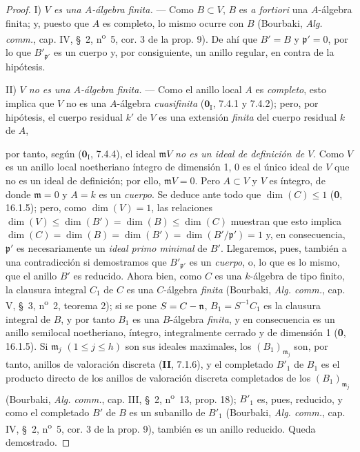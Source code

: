 \begin{proof}
I) \emph{$V$ es una $A$-álgebra finita.} --- Como $B\subset V$, $B$ es
\emph{a fortiori} una $A$-álgebra finita; y, puesto que $A$ es completo,
lo mismo ocurre con $B$ (Bourbaki, \emph{Alg. comm.}, cap. IV, \S~2,
n\textsuperscript{o}~5, cor. 3 de la prop. 9). De ahí que $B'=B$ y
$\mathfrak p'=0$, por lo que $B'_{\mathfrak p'}$ es un cuerpo y, por
consiguiente, un anillo regular, en contra de la hipótesis.

II) \emph{$V$ no es una $A$-álgebra finita.} --- Como el anillo local
$A$ es \emph{completo}, esto implica que $V$ no es una $A$-álgebra
\emph{cuasifinita} ($\mathbf{0}_{\mathrm I}$, 7.4.1 y 7.4.2); pero, por hipótesis, el
cuerpo residual $k'$ de $V$ es una extensión \emph{finita} del cuerpo residual
$k$ de $A$,


por tanto, según ($\mathbf{0}_{\mathrm I}$, 7.4.4), el ideal $\mathfrak mV$
\emph{no es un ideal de definición de} $V$. Como $V$ es un anillo local noetheriano
íntegro de dimensión 1, 0 es el único ideal de $V$ que no es un ideal
de definición; por ello, $\mathfrak mV=0$. Pero $A\subset V$ y $V$ es
íntegro, de donde $\mathfrak m=0$ y $A=k$ es un \emph{cuerpo}. Se deduce ante
todo que $\dim(C)\leqslant1$ (\textbf 0, 16.1.5); pero, como $\dim(V)=1$, las
relaciones
$\dim(V)\leqslant\dim(B')=\dim(B)\leqslant\dim(C)$
muestran que esto implica
$\dim(C)=\dim(B)=\dim(B')=\dim(B'/\mathfrak p')=1$ y, en consecuencia,
$\mathfrak p'$ es necesariamente un \emph{ideal primo minimal} de $B'$.
Llegaremos, pues, también a una contradicción si demostramos que
$B'_{\mathfrak p'}$ es un \emph{cuerpo}, o, lo que es lo mismo, que el anillo
$B'$ es reducido. Ahora bien, como $C$ es una $k$-álgebra de tipo finito,
la clausura integral $C_1$ de $C$ es una $C$-álgebra \emph{finita} (Bourbaki,
\emph{Alg. comm.}, cap. V, \S~3, n\textsuperscript{o}~2, teorema 2);
si se pone $S=C-\mathfrak n$, $B_1=S^{-1}C_1$ es la clausura integral de
$B$, y por tanto $B_1$ es una $B$-álgebra \emph{finita}, y en consecuencia es
un anillo semilocal noetheriano, íntegro, integralmente cerrado y de
dimensión 1 (\textbf{0}, 16.1.5). Si $\mathfrak m_j$ $(1\leqslant j\leqslant h)$
son sus ideales maximales, los $(B_1)_{\mathfrak m_j}$ son, por tanto,
anillos de valoración discreta (\textbf{II}, 7.1.6), y el completado $B'_1$ de
$B_1$ es el producto directo de los anillos de valoración discreta
completados de los $(B_1)_{\mathfrak m_j}$ (Bourbaki, \emph{Alg. comm.},
cap. III, \S~2, n\textsuperscript{o}~13, prop. 18); $B'_1$ es, pues,
reducido, y como el completado $B'$ de $B$ es un subanillo de $B'_1$
(Bourbaki, \emph{Alg. comm.}, cap. IV, \S~2, n\textsuperscript{o}~5,
cor. 3 de la prop. 9), también es un anillo reducido. Queda demostrado.
\end{proof}
